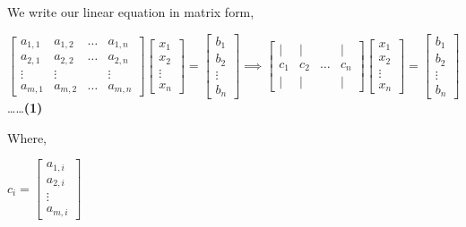 \documentclass[a4paper]{article}
\begin{document}
We write our linear equation in matrix form,
\begin{center}
    $ 
    \begin{bmatrix}
    a_{1,1} & a_{1,2} & \dots & a_{1,n} \\ 
    a_{2,1} & a_{2,2} & \dots & a_{2,n} \\
    \vdots  & \vdots  &       & \vdots  \\
    a_{m,1} & a_{m,2} & \dots & a_{m,n} 
    \end{bmatrix}
    \begin{bmatrix}
    x_1   \\ 
    x_2   \\
    \vdots\\
    x_n 
    \end{bmatrix} = 
    \begin{bmatrix}
    b_1   \\ 
    b_2   \\
    \vdots\\
    b_n 
    \end{bmatrix}
    
    \implies \begin{bmatrix}
    |   & |       &       & |     \\ 
    c_1 & c_2     & \dots & c_n   \\
    |   & |       &       & |        
    \end{bmatrix}
    \begin{bmatrix}
    x_1   \\ 
    x_2   \\
    \vdots\\
    x_n 
    \end{bmatrix} = 
    \begin{bmatrix}
    b_1   \\ 
    b_2   \\
    \vdots\\
    b_n 
    \end{bmatrix}
    $  \dots\dots \textbf{(1)}
\end{center}

Where,
\begin{center}
    $
    c_i = 
    \begin{bmatrix}
    a_{1,i}   \\ 
    a_{2,i}   \\
    \vdots    \\
    a_{m,i} 
    \end{bmatrix}
    $
\end{center}
\end{document}
